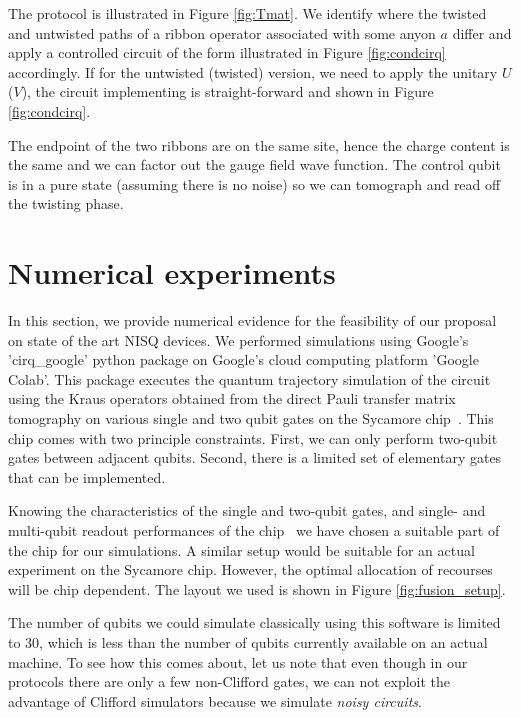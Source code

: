 \documentclass[a4paper,twocolumn,11pt, accepted=2024-06-14]{quantumarticle}
\begin{document}
The protocol is illustrated in Figure \ref{fig:Tmat}. We identify where the twisted and untwisted paths of a ribbon operator associated with some anyon $a$ differ and apply a controlled circuit of the form illustrated in Figure \ref{fig:condcirq} accordingly. If for the untwisted (twisted) version, we need to apply the unitary $U$ ($V$), the circuit implementing is straight-forward and shown in Figure \ref{fig:condcirq}.

The endpoint of the two ribbons are on the same site, hence the charge content is the same and we can factor out the gauge field wave function. 
The control qubit is in a pure state (assuming there is no noise) so we can tomograph and read off the twisting phase.


\section{Numerical experiments}\label{sec:num}

In this section, we provide numerical evidence for the feasibility of our proposal on state of the art NISQ devices. We performed simulations using Google's 'cirq\_google' python package on Google's cloud computing platform 'Google Colab'. This package executes the quantum trajectory simulation of the circuit using the Kraus operators obtained from the direct Pauli transfer matrix tomography on various single and two qubit gates on the Sycamore chip~\cite{weber}. This chip comes with two principle constraints. First, we can only perform two-qubit gates between adjacent qubits. Second, there is a limited set of elementary gates that can be implemented. 


Knowing the characteristics of the single and two-qubit gates, and single- and multi-qubit readout performances of the chip~\cite{weber} we have chosen a suitable part of the chip for our simulations. A similar setup would be suitable for an actual experiment on the Sycamore chip. However, the optimal allocation of recourses will be chip dependent. The layout we used is shown in Figure \ref{fig:fusion_setup}.


The number of qubits we could simulate classically using this software is limited to 30, which is less than the number of qubits currently available on an actual machine. To see how this comes about, let us note that even though in our protocols there are only a few non-Clifford gates, we can not exploit the advantage of Clifford simulators because we simulate \emph{noisy circuits}. 
\end{document}
